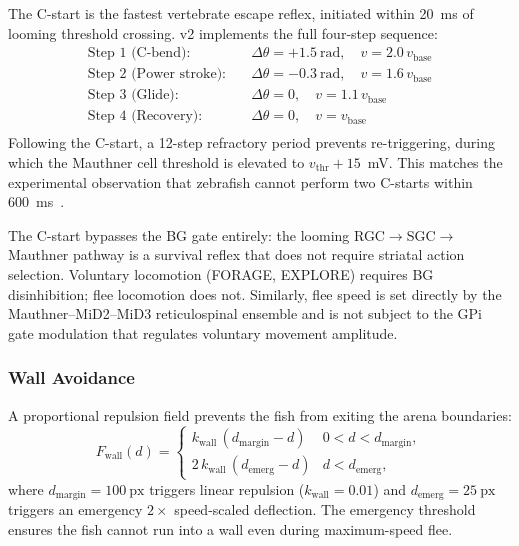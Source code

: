 \documentclass[11pt,a4paper]{article}
\begin{document}
The C-start is the fastest vertebrate escape reflex, initiated within
20~ms of looming threshold crossing.
v2 implements the full four-step sequence:
\begin{equation}\label{eq:cstart}
\begin{aligned}
  \text{Step 1 (C-bend):}   &\quad \Delta\theta = +1.5~\text{rad},\quad v = 2.0\,v_\mathrm{base} \\
  \text{Step 2 (Power stroke):} &\quad \Delta\theta = -0.3~\text{rad},\quad v = 1.6\,v_\mathrm{base} \\
  \text{Step 3 (Glide):}    &\quad \Delta\theta = 0,\quad v = 1.1\,v_\mathrm{base} \\
  \text{Step 4 (Recovery):} &\quad \Delta\theta = 0,\quad v = v_\mathrm{base} \\
\end{aligned}
\end{equation}
Following the C-start, a 12-step refractory period prevents re-triggering,
during which the Mauthner cell threshold is elevated to $v_\mathrm{thr} + 15$~mV.
This matches the experimental observation that zebrafish cannot
perform two C-starts within 600~ms~\cite{temizer2015}.

The C-start bypasses the BG gate entirely: the looming RGC$\to$SGC$\to$Mauthner
pathway is a survival reflex that does not require striatal action
selection.
Voluntary locomotion (FORAGE, EXPLORE) requires BG disinhibition;
flee locomotion does not.
Similarly, flee speed is set directly by the Mauthner--MiD2--MiD3
reticulospinal ensemble and is not subject to the GPi gate modulation
that regulates voluntary movement amplitude.

\subsubsection{Wall Avoidance}

A proportional repulsion field prevents the fish from exiting the
arena boundaries:
\begin{equation}\label{eq:wall_avoidance}
  F_\mathrm{wall}(d) =
  \begin{cases}
    k_\mathrm{wall}\,(d_\mathrm{margin} - d) & 0 < d < d_\mathrm{margin}, \\
    2\,k_\mathrm{wall}\,(d_\mathrm{emerg} - d) & d < d_\mathrm{emerg},
  \end{cases}
\end{equation}
where $d_\mathrm{margin} = 100~\text{px}$ triggers linear repulsion
($k_\mathrm{wall} = 0.01$) and $d_\mathrm{emerg} = 25~\text{px}$
triggers an emergency $2\times$ speed-scaled deflection.
The emergency threshold ensures the fish cannot run into a wall even
during maximum-speed flee.
\end{document}

